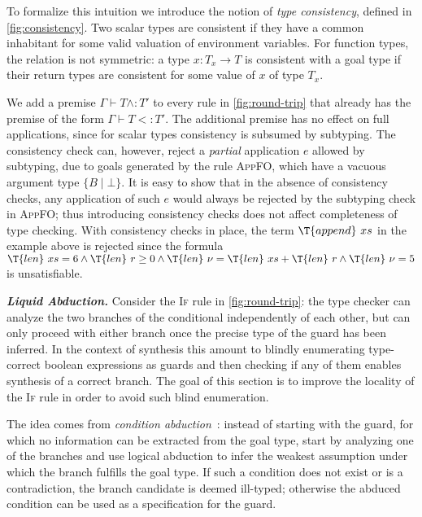\documentclass[10pt,preprint]{sigplanconf-pldi16}
\theoremstyle{definition}
\newcommand{\custompar}[1]{\parskip 0pt \textbf{\textit{#1}}}
\renewcommand{\And}{\wedge}
\newcommand{\Subt}{<:}
\newcommand{\Consi}{\mathrel{\mathrm{\wedge:}}}
\newcommand{\App}[2]{{#1}\ {#2}}
\newcommand{\env}{\Gamma}
\newcommand{\funT}[3]{{#1}\colon {#2} \to {#3}}
\begin{document}
To formalize this intuition we introduce the notion of \emph{type consistency}, defined in \autoref{fig:consistency}.
Two scalar types are consistent if they have a common inhabitant for some valid valuation of environment variables.
For function types, the relation is not symmetric:
a type $\funT{x}{T_x}{T}$ is consistent with a goal type if their return types are consistent for some value of $x$ of type $T_x$.

We add a premise $\env \vdash T\Consi T'$ to every rule in \autoref{fig:round-trip}
that already has the premise of the form $\env \vdash T\Subt T'$.
The additional premise has no effect on full applications, since for scalar types consistency is subsumed by subtyping.
The consistency check can, however, reject a \emph{partial} application $e$ allowed by subtyping,
due to goals generated by the rule \textsc{AppFO}, which have a vacuous argument type $\{B\mid\bot\}$.
It is easy to show that in the absence of consistency checks, 
any application of such $e$ would always be rejected by the subtyping check in \textsc{AppFO};
thus introducing consistency checks does not affect completeness of type checking.
With consistency checks in place, 
the term $\App{\T{append}}{xs}$ in the example above is rejected since the formula
$\App{\T{len}}{xs} = 6 \And \App{\T{len}}{r} \geq 0 \And \App{\T{len}}{\nu} = \App{\T{len}}{xs} + \App{\T{len}}{r} \And \App{\T{len}}{\nu} = 5$
is unsatisfiable.


\custompar{Liquid Abduction.}
Consider the \textsc{If} rule in \autoref{fig:round-trip}:
the type checker can analyze the two branches of the conditional independently of each other,
but can only proceed with either branch once the precise type of the guard has been inferred.
In the context of synthesis this amount to blindly enumerating type-correct boolean expressions as guards
and then checking if any of them enables synthesis of a correct branch.
The goal of this section is to improve the locality of the \textsc{If} rule
in order to avoid such blind enumeration.

The idea comes from \emph{condition abduction}~\cite{LeinoMi12,KneussKuKuSu13,AlurCR15}:
instead of starting with the guard, for which no information can be extracted from the goal type,
start by analyzing one of the branches and use logical abduction to infer the weakest assumption under which the branch fulfills the goal type.
If such a condition does not exist or is a contradiction, the branch candidate is deemed ill-typed;
otherwise the abduced condition can be used as a specification for the guard.
\end{document}
